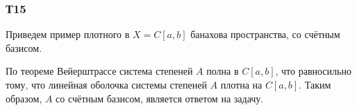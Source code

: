 \subsubsection*{Т15}

Приведем пример плотного в $X = C[a,b]$ банахова пространства, со счётным базисом. 

 
По теореме Вейерштрассе система степеней $A$ полна в $C[a, b]$, что равносильно тому, что линейная оболочка системы степеней $A$ плотна на $C[a,b]$. Таким образом, $A$ со счётным базисом, является ответом на задачу.